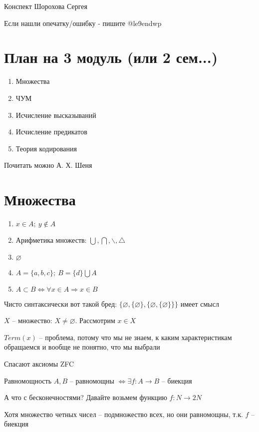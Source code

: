 \documentclass[12pt]{article}
\begin{document}
\begin{flushright}
    Конспект Шорохова Сергея

    Если нашли опечатку/ошибку - пишите @le9endwp
\end{flushright}

\section*{План на 3 модуль (или 2 сем...)}

\begin{enumerate}
    \item Множества
    \item ЧУМ
    \item Исчисление высказываний
    \item Исчисление предикатов
    \item Теория кодирования
\end{enumerate}

Почитать можно А. Х. Шеня

\section*{Множества}

\begin{enumerate}
    \item $x \in A;\ y \not \in A$
    \item Арифметика множеств: $\bigcup, \bigcap, \backslash, \triangle$
    \item $\varnothing$
    \item $A = \{ a, b, c \};\ B = \{d\} \bigcup A$
    \item $A \subset B \Leftrightarrow \forall x \in A \Rightarrow x \in B$
\end{enumerate}

\begin{Remark}{}
    Чисто синтаксически вот такой бред: $\{ \varnothing, \{ \varnothing \}, \{ \varnothing, \{ \varnothing \} \} \}$ имеет смысл
\end{Remark}

$X$ -- множество: $X \neq \varnothing$. Рассмотрим $x \in X$

$Term(x)$ -- проблема, потому что мы не знаем, к каким характеристикам обращаемся и вообще не понятно, что мы выбрали

Спасают аксиомы ZFC

\begin{defin}{Равномощность}
    $A, B$ -- равномощны $\Leftrightarrow \exists f : A \rightarrow B$ -- биекция

    А что с бесконечностями? Давайте возьмем функцию $f : N \rightarrow 2N$

    Хотя множество четных чисел -- подмножество всех, но они равномощны, т.к. $f$ -- биекция
\end{defin}
\end{document}
